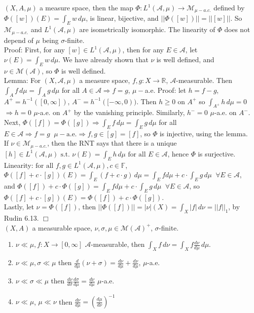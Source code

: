 \documentclass[12pt]{article}
\newcommand{\st}[0]{ \textrm{ s.t. } }
\newcommand{\fall}[0] { \textrm{ for all } }
\newcommand{\aew}[0] { \textrm{a.e.} }
\newcommand{\reals}[0] { \mathbb{R}}
\newcommand{\A}[0] { \mathcal{A} }
\newcommand{\M}[0] { \mathcal{M} }
\newcommand{\rimply}[0] { \Rightarrow }
\newcommand{\rarw}[0] { \rightarrow }
\begin{document}
$(X, A, \mu)$ a measure space, then the map $\Phi: L^1(\A, \mu) \rarw \M_{\mu-a.c.}$ defined by $\Phi([w])(E) = \int_E w\, d\mu$, is linear, bijective, and $|| \Phi([w]) || = ||[w]||$. So $\M_{\mu-a.c.}$ and $L^1(\A, \mu)$ are isometrically isomorphic. The linearity of $\Phi$ does not depend of $\mu$ being $\sigma$-finite.\\

\noindent
Proof: First, for any $[w] \in L^1(\A, \mu)$, then for any $E \in \A$, let $\nu(E) = \int_E w \, d\mu$. We have already shown that $\nu$ is well defined, and $\nu \in \M(\A)$, so $\Phi$ is well defined. \\

\noindent
Lemma: For $(X, \A, \mu)$ a measure space, $f,g: X \rarw \reals$, $\A$-measurable. Then $ \int_A f \,d\mu = \int_A g \, d\mu$ for all $A \in \A \rimply f = g$, $\mu-$a.e. Proof: let $h = f - g$, $A^+ = h^{-1}( [0,\infty] )$, $A^- = h^{-1}( [-\infty,0) )$. Then $h \ge 0$ on $A^+$ so $\int_{A^+} h \,d\mu = 0$ $\rimply h=0$ $\mu$-a.e. on $A^+$ by the vanishing principle. Similarly, $h^- = 0$ $\mu$-a.e. on $A^-$. \\

\noindent
Next, $\Phi([f]) = \Phi([g]) \rimply \int_E f \, d\mu = \int_E g \, d\mu$ for all $E \in \A \rimply f=g \; \;\mu-\aew \rimply f,g \in [g] = [f]$, so $\Phi$ is injective, using the lemma. If $\nu \in \M_{\mu-a.c.}$, then the RNT says that there is a unique $[h] \in L^1(\A, \mu)  \st \nu(E) = \int_E h \, d\mu  \fall E \in \A $, hence $\Phi$ is surjective. \\

\noindent
Linearity:$\fall f,g \in L^1(\A, \mu), c \in \mathbb{F}$,  $\Phi([f] + c \cdot [g])(E) = \int_E \left( f + c \cdot g \right) \, d\mu = \int_E f d\mu + c \cdot \int_E g  \, d\mu \; \; \forall E \in \A$, and 
 $\Phi([f]) + c \cdot \Phi([g]) = \int_E f d\mu + c \cdot \int_E g  \, d\mu \; \; \forall E \in \A$, so 
 $ \Phi([f] + c \cdot [g])(E) = \Phi([f]) + c \cdot \Phi([g])$. \\
 
\noindent
Lastly, let $ \nu = \Phi([f])$, then $||\Phi([f])|| = |\nu|(X) = \int_X |f| \, d\nu = ||f||_1$, by Rudin 6.13. $\Box$ \\






$(X, A)$ a measurable space, $\nu,\sigma,\mu \in \M(\A)^+$, $\sigma$-finite.

\begin{enumerate}
\item
$\nu \ll \mu, f: X \rarw [0,\infty]$ $\A$-measurable, then $\int_X f \, d\nu = \int_X f \frac{d\nu}{d\mu} \, d\mu$.
\item
$\nu \ll \mu, \sigma \ll \mu$ then $\frac{d}{d\mu}( \nu + \sigma ) = \frac{d\nu}{d\mu} +  \frac{d\nu}{d\mu}$, $\mu$-a.e.
\item
$\nu \ll \sigma \ll \mu$ then $\frac{d\nu}{d\sigma}\frac{d\sigma}{d\mu} = \frac{d\nu}{d\mu}$ $\mu$-a.e.
\item
$\nu \ll \mu$, $\mu \ll \nu$ then $\frac{d\nu}{d\mu} = \left( \frac{d\mu}{d\nu} \right)^{-1} $
\end{enumerate}
\end{document}
